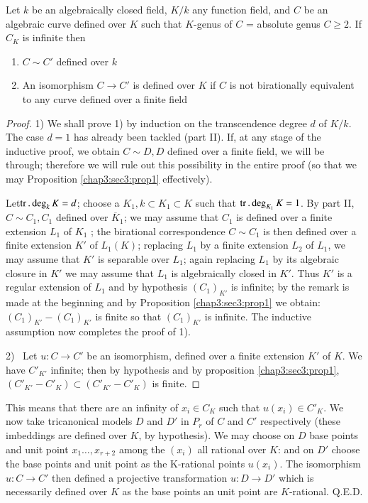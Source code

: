 \setcounter{theorem}{0}
\begin{theorem}\label{chap3:sec3:thm1}%
  Let $k$ be an algebraically closed field, $K/k$ any function field,
  and $C$ be an algebraic curve defined over $K$ such that $K$-genus
  of $C$ = absolute genus $C \geq 2$. If $C_K$ is infinite then 
  \begin{enumerate}[1)]
  \item $C \sim  C'$ defined over $k$
  \item An isomorphism $C \rightarrow C'$ is defined over $K$ if $C$
    is not birationally equivalent to any curve defined over a finite
    field 
  \end{enumerate}
\end{theorem}

\begin{proof}%
  1) We shall prove 1) by induction on the transcendence degree
  $d$ of $K/k$. The case $d = 1$ has already been tackled (part
  II). If, at any stage of the inductive proof, we obtain $C \sim
  D, D$ defined over a finite field, we will be through; therefore we
  will rule out this possibility in the entire proof (so that we may
  Proposition \ref{chap3:sec3:prop1} effectively). 


  Let\pageoriginale $\operatorname{tr}.\deg_k K = d $; choose a $K_1, k \subset K_1 \subset K$ such
  that $\operatorname{tr}. \deg_{K_1} K = 1$. By part II, $C \sim C_1,C_1 $  defined
  over $\overline{{K}}_{1}$; we may assume that $C_1$ is defined over a
  finite extension $L_1$ of $K_1$ ; the birational correspondence $C
  \sim C_1$  is then defined over a finite extension $K'$ of $L_1(K)$;
  replacing $L_1$ by a finite extension $L_2$ of $L_1$, we may assume
  that $K'$ is separable over $L_1$; again replacing $L_1$ by its
  algebraic closure in $K'$ we may assume that $L_1$ is algebraically
  closed in $K'$. Thus $K'$ is a regular extension of $L_1$ and by
  hypothesis $(C_1)_{K'}$ is infinite; by the remark is made at the
  beginning and by Proposition \ref{chap3:sec3:prop1} we obtain: ${(C_1)_{K'} -
    (C_1)_{K'}}$ is finite so that $(C_1)_{K'}$ is infinite. The
  inductive assumption now completes the proof of 1). 
  
 2)~ Let $u : C \rightarrow C'$ be an isomorphism, defined over a
 finite extension $K'$ of $K$. We have ${C'}_{K'}$ infinite; then by
 hypothesis and by proposition \ref{chap3:sec3:prop1}, $({C'}_{K'} - {C'}_{K}) \subset
 (C'_{K'} - C'_{K})$ is finite. 
\end{proof}

 This means that there are an infinity of $x{_i\in C_K}$ such that
 $u(x_i)\in C'_K$. We now take tricanonical models $D$ and $D'$ in
 ${P}_r$ of $C$ and $C'$  respectively (these imbeddings are defined over $K$,
 by hypothesis). We may choose on $D$ base points and unit point ${x_1
   \ldots,x_{r+2}}$ among the ${(x_i)}$ all rational over $K$: and on
 $D'$ choose the base points and unit point as the K-rational points
 ${u(x_i)}$. The isomorphism $u : {C \rightarrow C'}$ then defined a
 projective transformation $u :  {D \rightarrow D'}$ which is
 necessarily defined over $K$ as the base points an unit point are
 $K$-rational. \hfill {Q.E.D.} 

